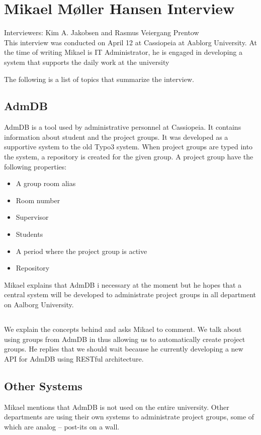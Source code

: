 
\section{Mikael Møller Hansen Interview}
\label{sec:mikael}
Interviewers: Kim A. Jakobsen and Rasmus Veiergang Prentow\\

This interview was conducted on April 12\ths{} at Cassiopeia at Aablorg University.
At the time of writing Mikael is IT Administrator, he is engaged in developing a system that supports the daily work at the university

The following is a list of topics that summarize the interview.

\subsection*{AdmDB}
AdmDB is a tool used by administrative personnel at Cassiopeia.
It contains information about student and the project groups.
It was developed as a supportive system to the old Typo3 system. When project groups are typed into the system, a repository is created for the given group. A project group have the following properties:
\begin{itemize}
	\item A group room alias
	\item Room number
	\item Supervisor
	\item Students
	\item A period where the project group is active
	\item Repository
\end{itemize}

Mikael explains that AdmDB i necessary at the moment but he hopes that a central system will be developed to administrate project groups in all department on Aalborg University. 

\subsection*{\system{}}
We explain the concepts behind \system{} and asks Mikael to comment. 
We talk about using groups from AdmDB in \system{} thus allowing us to automatically create project groups. 
He replies that we should wait because he currently developing a new API for AdmDB using RESTful architecture. 

\subsection*{Other Systems}
Mikael mentions that AdmDB is not used on the entire university.
Other departments are using their own systems to administrate project groups, some of which are analog -- post-its on a wall.